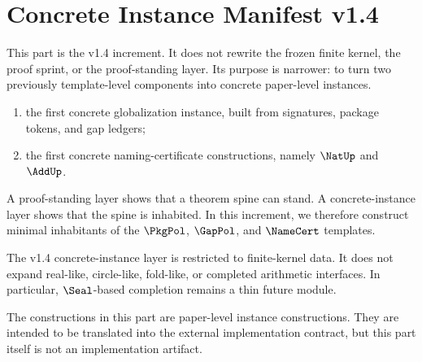 \chapter{Concrete Instance Manifest v1.4}
\label{ch:v14-concrete-manifest}

This part is the v1.4 increment. It does not rewrite the frozen finite kernel, the proof sprint, or the proof-standing layer. Its purpose is narrower: to turn two previously template-level components into concrete paper-level instances.

\begin{enumerate}
  \item the first concrete globalization instance, built from signatures, package tokens, and gap ledgers;
  \item the first concrete naming-certificate constructions, namely \(\NatUp\) and \(\AddUp\).
\end{enumerate}

\begin{principle}
A proof-standing layer shows that a theorem spine can stand. A concrete-instance layer shows that the spine is inhabited. In this increment, we therefore construct minimal inhabitants of the \(\PkgPol\), \(\GapPol\), and \(\NameCert\) templates.
\end{principle}

\begin{definition}[Scope of v1.4]
The v1.4 concrete-instance layer is restricted to finite-kernel data. It does not expand real-like, circle-like, fold-like, or completed arithmetic interfaces. In particular, \(\Seal\)-based completion remains a thin future module.
\end{definition}

\begin{remark}[Status]
The constructions in this part are paper-level instance constructions. They are intended to be translated into the external implementation contract, but this part itself is not an implementation artifact.
\end{remark}
